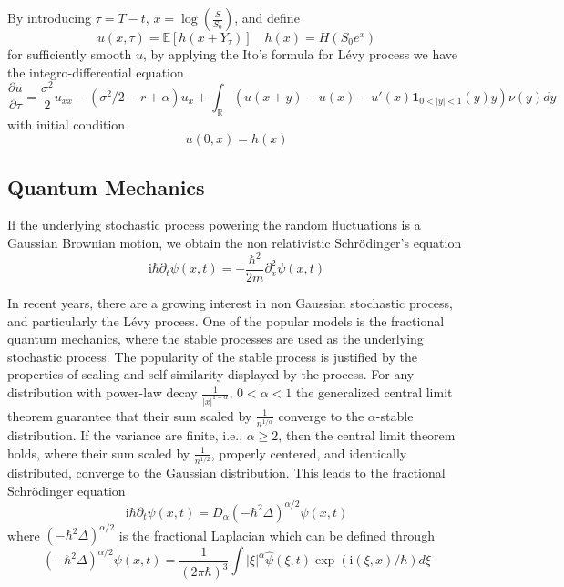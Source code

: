\documentclass[10pt,a4paper]{article}
\newcommand{\ii}[0]{\mathrm{i}}
\newcommand{\RR}[0]{\mathbb{R}}
\theoremstyle{definition}
\begin{document}
By introducing $\tau = T-t$, $x=\log\left( \frac{S}{S_0} \right)$, and define
\begin{equation}
	u(x,\tau) = \mathbb{E}[h(x+Y_\tau)]\quad h(x) = H(S_0 e^x)
\end{equation}
 for sufficiently smooth $u$, by applying the Ito's formula for L\'evy process we have the integro-differential equation
\begin{equation}
	\frac{\partial u}{\partial \tau} = \frac{\sigma^2}{2}u_{xx} - (\sigma^2/2-r+\alpha) u_x + \int_\RR (u(x+y)-u(x)-u'(x)\mathbf{1}_{0<|y|<1}(y)y)\nu(y)dy
\end{equation}
with initial condition
\begin{equation}
	u(0,x) = h(x)
\end{equation}


\subsection{Quantum Mechanics}

If the underlying stochastic process powering the random fluctuations is a Gaussian Brownian motion, we obtain the non relativistic Schr\"odinger's equation
\begin{equation}
	\ii \hbar \partial_t \psi(x,t) = -\frac{\hbar^2}{2m}\partial^2_{x} \psi(x,t)
\end{equation}

In recent years, there are a growing interest in non Gaussian stochastic process, and particularly the L\'evy process. One of the popular models is the fractional quantum mechanics, where the stable processes are used as the underlying stochastic process. The popularity of the stable process is justified by the properties of scaling and self-similarity displayed by the process. For any distribution with power-law decay $\frac{1}{|x|^{1+\alpha}}$, $0<\alpha<1$ the generalized central limit theorem guarantee that their sum scaled by $\frac{1}{n^{1/\alpha}}$ converge to the $\alpha$-stable distribution. If the variance are finite, i.e., $\alpha\geq 2$, then the central limit theorem holds, where  their sum scaled by $\frac{1}{n^{1/2}}$, properly centered, and identically distributed, converge to the Gaussian distribution.  This leads to the fractional Schr\"odinger equation
\begin{equation}
	\ii \hbar \partial_t \psi(x,t) = D_\alpha (-\hbar^2 \Delta)^{\alpha/2}\psi(x,t)
\end{equation}
where $(-\hbar^2 \Delta)^{\alpha/2}$ is the fractional Laplacian which can be defined through
\begin{equation}
	(-\hbar^2 \Delta)^{\alpha/2}\psi(x,t) = \frac{1}{(2\pi \hbar)^3}\int |\xi|^\alpha \hat \psi(\xi,t) \exp(\ii (\xi,x)/\hbar)d\xi
\end{equation}
\end{document}
